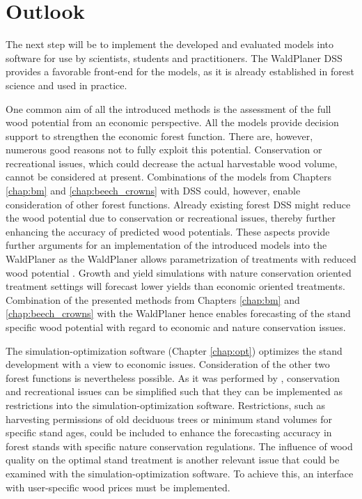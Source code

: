\section{Outlook}
\label{sec:discussion:outlook}
The next step will be to implement the developed and evaluated models into software for use by scientists, students and practitioners. The WaldPlaner DSS provides a favorable front-end for the models, as it is already established in forest science and used in practice.

One common aim of all the introduced methods is the assessment of the full wood potential from an economic perspective. All the models provide decision support to strengthen the economic forest function. There are, however, numerous good reasons not to fully exploit this potential. Conservation or recreational issues, which could decrease the actual harvestable wood volume, cannot be considered at present. Combinations of the models from Chapters \ref{chap:bm} and \ref{chap:beech_crowns} with DSS could, however, enable consideration of other forest functions. Already existing forest DSS might reduce the wood potential due to conservation or recreational issues, thereby further enhancing the accuracy of predicted wood potentials. These aspects provide further arguments for an implementation of the introduced models into the WaldPlaner as the WaldPlaner allows parametrization of treatments with reduced wood potential \citep[p. 90-93]{hansen_2014}. Growth and yield simulations with nature conservation oriented treatment settings will forecast lower yields than economic oriented treatments. Combination of the presented methods from Chapters \ref{chap:bm} and \ref{chap:beech_crowns} with the WaldPlaner hence enables forecasting of the stand specific wood potential with regard to economic and nature conservation issues.

The si\-mu\-la\-tion-op\-ti\-mi\-za\-tion software (Chapter \ref{chap:opt}) optimizes the stand development with a view to economic issues. Consideration of the other two forest functions is nevertheless possible. As it was performed by \citet{yousefpour_2009}, conservation and recreational issues can be simplified such that they can be implemented as restrictions into the si\-mu\-la\-tion-op\-ti\-mi\-za\-tion software. Restrictions, such as harvesting permissions of old deciduous trees or minimum stand volumes for specific stand ages, could be included to enhance the forecasting accuracy in forest stands with specific nature conservation regulations. The influence of wood quality on the optimal stand treatment is another relevant issue that could be examined with the si\-mu\-la\-tion-op\-ti\-mi\-za\-tion software. To achieve this, an interface with user-specific wood prices must be implemented.

